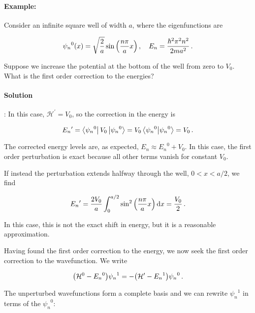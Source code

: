 \documentclass[12pt, titlepage]{article}
\begin{document}
\begin{mdframed}[backgroundcolor=gray!20]
\paragraph*{Example:}
Consider an infinite square well of width $a$, where the eigenfunctions are 

\begin{equation*}
	{\psi_n}^0(x) = \sqrt{\frac{2}{a}}\sin\qty(\frac{n\pi}{a}x) \,,\quad {E_n} = \frac{\hbar^2\pi^2n^2}{2ma^2} \,.
\end{equation*}

Suppose we increase the potential at the bottom of the well from zero to $V_0$. What is the first order correction to the energies?

\paragraph*{Solution}:
In this case, $\mathcal{H}^{\prime} = V_0$, so the correction in the energy is

\begin{equation*}
	{E_n}^{\prime} = \bra{{\psi_n}^0}V_0\ket{{\psi_n}^0} = V_0\bra{{\psi_n}^0}\ket{{\psi_n}^0} = V_0 \,.
\end{equation*}

The corrected energy levels are, as expected,  $E_n \approx {E_n}^0 + V_0$. In this case, the first order perturbation is exact because all other terms vanish for constant $V_0$.

If instead the perturbation extends halfway through the well, $0<x<a/2$, we find

\begin{equation*}
	{E_n}^{\prime} = \frac{2V_0}{a}\int_{0}^{a/2}\sin^2\qty(\frac{n\pi}{a}x)\dd{x} = \frac{V_0}{2} \,.
\end{equation*}

In this case, this is not the exact shift in energy, but it is a reasonable approximation.
\end{mdframed}

Having found the first order correction to the energy, we now seek the first order correction to the wavefunction. We write

\begin{equation}
	\qty(\mathcal{H}^0 - {E_n}^0){\psi_n}^1 = -\qty(\mathcal{H}^{\prime} - {E_n}^1){\psi_n}^{0} \,.
\end{equation}

The unperturbed wavefunctions form a complete basis and we can rewrite ${\psi_n}^{1}$ in terms of the ${\psi_n}^0$:
\end{document}
